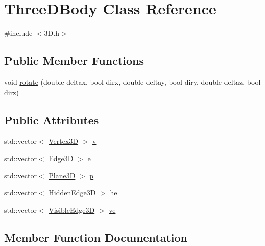 \hypertarget{class_three_d_body}{}\section{Three\+D\+Body Class Reference}
\label{class_three_d_body}


{\ttfamily \#include $<$3\+D.\+h$>$}

\subsection*{Public Member Functions}
\begin{DoxyCompactItemize}
\item 
void \hyperlink{class_three_d_body_a55405b2005589e8b539417b8fa58421a}{rotate} (double deltax, bool dirx, double deltay, bool diry, double deltaz, bool dirz)
\end{DoxyCompactItemize}
\subsection*{Public Attributes}
\begin{DoxyCompactItemize}
\item 
std\+::vector$<$ \hyperlink{class_vertex3_d}{Vertex3D} $>$ \hyperlink{class_three_d_body_ae85a9587eced34b16806c2c2f009d208}{v}
\item 
std\+::vector$<$ \hyperlink{class_edge3_d}{Edge3D} $>$ \hyperlink{class_three_d_body_a20054d806b11e6d6ee768231a1ee61d3}{e}
\item 
std\+::vector$<$ \hyperlink{class_plane3_d}{Plane3D} $>$ \hyperlink{class_three_d_body_a871bc38d1590dfb2f076a8ca2def89ad}{p}
\item 
std\+::vector$<$ \hyperlink{class_hidden_edge3_d}{Hidden\+Edge3D} $>$ \hyperlink{class_three_d_body_a89940d00825338f6f685b7522be1d200}{he}
\item 
std\+::vector$<$ \hyperlink{class_visible_edge3_d}{Visible\+Edge3D} $>$ \hyperlink{class_three_d_body_ab35d0ee77c7176e3133a9d3357d173e2}{ve}
\end{DoxyCompactItemize}


\subsection{Member Function Documentation}
